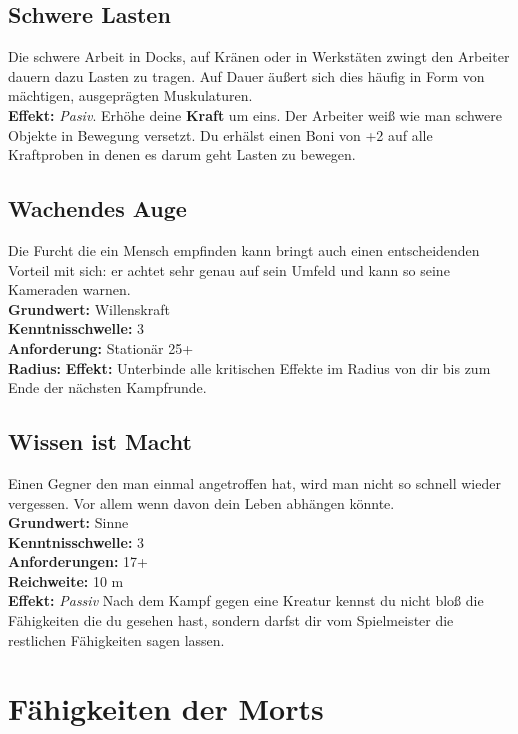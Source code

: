 \subsection*{Schwere Lasten} \label{sk:schwere_lasten}
Die schwere Arbeit in Docks, auf Kränen oder in Werkstäten zwingt den Arbeiter dauern dazu Lasten zu tragen. Auf Dauer äußert sich dies häufig in Form von mächtigen, ausgeprägten Muskulaturen.\\
\textbf{Effekt:} \textit{Pasiv}. Erhöhe deine \textbf{Kraft} um eins. Der Arbeiter weiß wie man schwere Objekte in Bewegung versetzt. Du erhälst einen Boni von +2 auf alle Kraftproben in denen es darum geht Lasten zu bewegen.

\subsection*{Wachendes Auge} \label{sk:wachendes_auge}
Die Furcht die ein Mensch empfinden kann bringt auch einen entscheidenden Vorteil mit sich: er achtet sehr genau auf sein Umfeld und kann so seine Kameraden warnen. \\
\textbf{Grundwert:} Willenskraft \\
\textbf{Kenntnisschwelle:} 3 \\
\textbf{Anforderung:} Stationär 25+ \\
\textbf{Radius:}
\textbf{Effekt:} Unterbinde alle kritischen Effekte im Radius von dir bis zum Ende der nächsten Kampfrunde.

\subsection*{Wissen ist Macht} \label{sk:wissenistmacht}
Einen Gegner den man einmal angetroffen hat, wird man nicht so schnell wieder vergessen. Vor allem wenn davon dein Leben abhängen könnte.\\
\textbf{Grundwert:} Sinne \\
\textbf{Kenntnisschwelle:} 3 \\
\textbf{Anforderungen:} 17+ \\
\textbf{Reichweite:} 10 m \\
\textbf{Effekt:} \textit{Passiv} Nach dem Kampf gegen eine Kreatur kennst du nicht bloß die Fähigkeiten die du gesehen hast, sondern darfst dir vom Spielmeister die restlichen Fähigkeiten sagen lassen.


\section{Fähigkeiten der Morts} \label{mortsskills}

